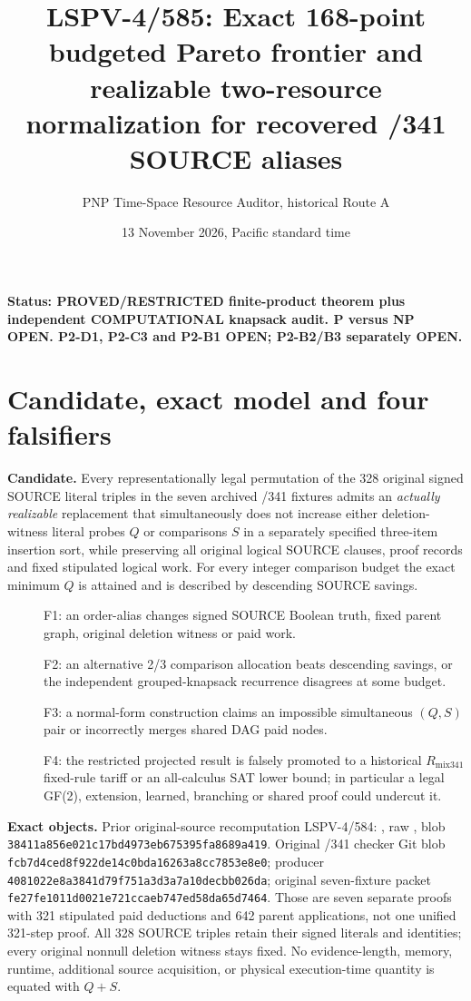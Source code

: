 \documentclass[11pt]{article}
\title{LSPV-4/585: Exact 168-point budgeted Pareto frontier and realizable two-resource normalization for recovered /341 SOURCE aliases}
\author{PNP Time-Space Resource Auditor, historical Route A}
\date{13 November 2026, Pacific standard time}
\begin{document}
\maketitle
\noindent\textbf{Status: PROVED/RESTRICTED finite-product theorem plus independent COMPUTATIONAL knapsack audit. P versus NP OPEN. P2-D1, P2-C3 and P2-B1 OPEN; P2-B2/B3 separately OPEN.}

\section*{Candidate, exact model and four falsifiers}
\noindent\textbf{Candidate.} Every representationally legal permutation of the 328 original signed SOURCE literal triples in the seven archived /341 fixtures admits an \emph{actually realizable} replacement that simultaneously does not increase either deletion-witness literal probes $Q$ or comparisons $S$ in a separately specified three-item insertion sort, while preserving all original logical SOURCE clauses, proof records and fixed stipulated logical work. For every integer comparison budget the exact minimum $Q$ is attained and is described by descending SOURCE savings.

\begin{description}
\item[] F1: an order-alias changes signed SOURCE Boolean truth, fixed parent graph, original deletion witness or paid work.
\item[] F2: an alternative 2/3 comparison allocation beats descending savings, or the independent grouped-knapsack recurrence disagrees at some budget.
\item[] F3: a normal-form construction claims an impossible simultaneous $(Q,S)$ pair or incorrectly merges shared DAG paid nodes.
\item[] F4: the restricted projected result is falsely promoted to a historical $R_{\mathrm{mix341}}$ fixed-rule tariff or an all-calculus SAT lower bound; in particular a legal GF(2), extension, learned, branching or shared proof could undercut it.
\end{description}

\noindent\textbf{Exact objects.} Prior original-source recomputation LSPV-4/584: , raw , blob \texttt{38411a856e021c17bd4973eb675395fa8689a419}. Original /341 checker Git blob \texttt{fcb7d4ced8f922de14c0bda16263a8cc7853e8e0}; producer \texttt{4081022e8a3841d79f751a3d3a7a10decbb026da}; original seven-fixture packet \texttt{fe27fe1011d0021e721ccaeb747ed58da65d7464}. Those are seven separate proofs with 321 stipulated paid deductions and 642 parent applications, not one unified 321-step proof. All 328 SOURCE triples retain their signed literals and identities; every original nonnull deletion witness stays fixed. No evidence-length, memory, runtime, additional source acquisition, or physical execution-time quantity is equated with $Q+S$.
\end{document}
